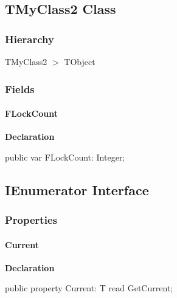 \documentclass{report}
\begin{document}
\subsection*{TMyClass2 Class}
\subsubsection*{\large{\textbf{Hierarchy}}\normalsize\hspace{1ex}\hfill}
TMyClass2 {$>$} TObject
\subsubsection*{\large{\textbf{Fields}}\normalsize\hspace{1ex}\hfill}
\paragraph*{FLockCount}\hspace*{\fill}

\begin{list}{}{
\setlength{\itemindent}{0cm}
\setlength{\listparindent}{0cm}
\setlength{\leftmargin}{\evensidemargin}
\addtolength{\leftmargin}{\tmplength}
\settowidth{\labelsep}{X}
\addtolength{\leftmargin}{\labelsep}
\setlength{\labelwidth}{\tmplength}
}
\begin{flushleft}
\item[\textbf{Declaration}\hfill]
\begin{ttfamily}
public var FLockCount: Integer;\end{ttfamily}


\end{flushleft}
\end{list}
\subsection*{IEnumerator Interface}
\subsubsection*{\large{\textbf{Properties}}\normalsize\hspace{1ex}\hfill}
\paragraph*{Current}\hspace*{\fill}

\begin{list}{}{
\setlength{\itemindent}{0cm}
\setlength{\listparindent}{0cm}
\setlength{\leftmargin}{\evensidemargin}
\addtolength{\leftmargin}{\tmplength}
\settowidth{\labelsep}{X}
\addtolength{\leftmargin}{\labelsep}
\setlength{\labelwidth}{\tmplength}
}
\begin{flushleft}
\item[\textbf{Declaration}\hfill]
\begin{ttfamily}
public property Current: T read GetCurrent;\end{ttfamily}


\end{flushleft}
\end{list}
\end{document}
